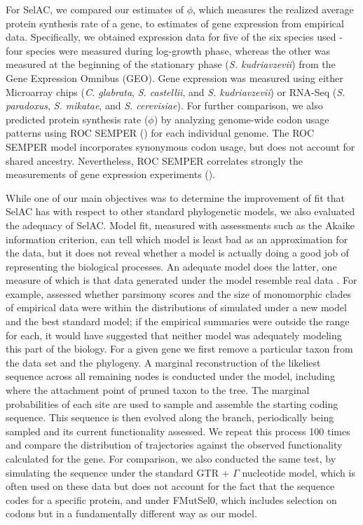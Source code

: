 \documentclass{article}
\newcommand{\selac}{SelAC\xspace}
\begin{document}
For \selac, we compared our estimates of $\phi$, which measures the realized average protein synthesis rate of a gene, to estimates of gene expression from empirical data.
Specifically, we obtained expression data for five of the six species used - four species were measured during log-growth phase, whereas the other was measured at the beginning of the stationary phase (\emph{S. kudriavzevii}) from the Gene Expression Omnibus (GEO). 
Gene expression was measured using either Microarray chips (\emph{C. glabrata}, \emph{S. castellii}, and \emph{S. kudriavzevii}) or RNA-Seq (\emph{S. paradoxus}, \emph{S. mikatae}, and \emph{S. cerevisiae}).
For further comparison, we also predicted protein synthesis rate ($\phi$) by analyzing genome-wide codon usage patterns using ROC SEMPER (\citet{GilchristEtAl2015}) for each individual genome.
The ROC SEMPER model incorporates synonymous codon usage, but does not account for shared ancestry.
Nevertheless, ROC SEMPER correlates strongly the measurements of gene expression experiments (\citet{GilchirstEtAl2015}).

While one of our main objectives was to determine the improvement of fit that \selac has with respect to other standard phylogenetic models, we also evaluated the adequacy of \selac.
Model fit, measured with assessments such as the Akaike information criterion, can tell which model is least bad as an approximation for the data, but it does not reveal whether a model is actually doing a good job of representing the biological processes.
An adequate model does the latter, one measure of which is that data generated under the model resemble real data \citep{goldman1993statistical}.
For example,  \citet{BeaulieuEtAl2013} assessed whether parsimony scores and the size of monomorphic clades of empirical data were within the distributions of simulated under a new model and the best standard model; if the empirical summaries were outside the range for each, it would have suggested that neither model was adequately modeling this part of the biology. 
For a given gene we first remove a particular taxon from the data set and the phylogeny.
A marginal reconstruction of the likeliest sequence across all remaining nodes is conducted under the model, including where the attachment point of pruned taxon to the tree.
The marginal probabilities of each site are used to sample and assemble the starting coding sequence.
This sequence is then evolved along the branch, periodically being sampled and its current functionality assessed.
We repeat this process 100 times and compare the distribution of trajectories against the observed functionality calculated for the gene.
For comparison, we also conducted the same test, by simulating the sequence under the standard GTR + $\Gamma$ nucleotide model, which is often used on these data but does not account for the fact that the sequence codes for a specific protein, and under FMutSel0, which includes selection on codons but in a fundamentally different way as our model.
\end{document}
